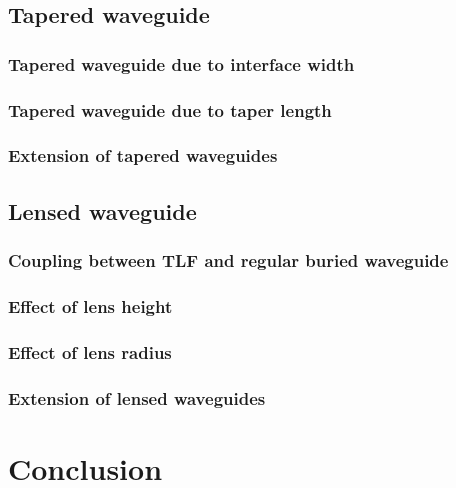 \section{Tapered waveguide}


\subsection{Tapered waveguide due to interface width} 


\subsection{Tapered waveguide due to taper length}


\subsection{Extension of tapered waveguides}
\label{sect:optim_tapered_ext}


\section{Lensed waveguide}


\subsection{Coupling between TLF and regular buried waveguide}
\label{sect:optim_lensed_regular}


\subsection{Effect of lens height}

%
\subsection{Effect of lens radius}


\subsection{Extension of lensed waveguides}
\label{sect:optim_lensed_ext}

%
\chapter{Conclusion}










%



